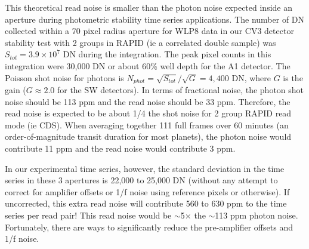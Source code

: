 \documentclass{aastex62}
\begin{document}
This theoretical read noise is smaller than the photon noise expected inside an aperture during photometric stability time series applications.
The number of DN collected within a 70 pixel radius aperture for WLP8 data in our CV3 detector stability test with 2 groups in RAPID (ie a correlated double sample) was $S_{tot}=3.9\times 10^7$ DN during the integration.
The peak pixel counts in this integration were 30,000 DN or about 60\% well depth for the A1 detector.
The Poisson shot noise for photons is $N_{phot} = \sqrt{S_{tot}} / \sqrt{G} = 4,400$ DN, where $G$ is the gain ($G \approx 2.0$ for the SW detectors).
In terms of fractional noise, the photon shot noise should be 113 ppm and the read noise should be 33 ppm.
Therefore, the read noise is expected to be about 1/4 the shot noise for 2 group RAPID read mode (ie CDS).
When averaging together 111 full frames over 60 minutes (an order-of-magnitude transit duration for most planets), the photon noise would contribute 11 ppm and the read noise would contribute 3 ppm.

In our experimental time series, however, the standard deviation in the time series in these 3 apertures is 22,000 to 25,000 DN (without any attempt to correct for amplifier offsets or 1/f noise using reference pixels or otherwise).
If uncorrected, this extra read noise will contribute 560 to 630 ppm to the time series per read pair!
This read noise would be $\sim$5$\times$ the $\sim$113 ppm photon noise.
Fortunately, there are ways to significantly reduce the pre-amplifier offsets and 1/f noise.
\end{document}
